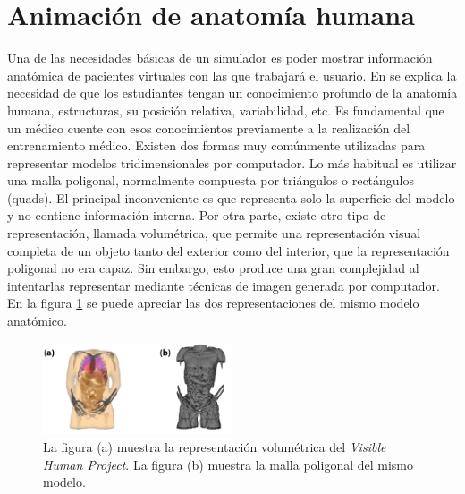 \section{Animación de anatomía humana} 
\label{anatomy}



Una de las necesidades básicas de un simulador es poder mostrar información anatómica de pacientes virtuales con las que trabajará el usuario. En  \cite{preim2018survey} se explica la necesidad de que los estudiantes tengan un conocimiento profundo de la anatomía humana, estructuras, su posición relativa, variabilidad, etc. Es fundamental que un médico cuente con esos conocimientos previamente a la realización del entrenamiento médico.
Existen dos formas muy comúnmente utilizadas para representar modelos tridimensionales por computador. Lo más habitual es utilizar una malla poligonal, normalmente compuesta por triángulos o rectángulos (quads). El principal inconveniente es que representa solo la superficie del modelo y no contiene información interna.  %
Por otra parte, existe otro tipo de representación, llamada volumétrica, que permite una representación visual completa de un objeto tanto del exterior como del interior, que la representación poligonal no era capaz. Sin embargo, esto produce una gran complejidad al intentarlas representar mediante técnicas de imagen generada por computador.
En la figura \ref{fig:HVP} se puede apreciar las dos representaciones del mismo modelo anatómico.

\begin{figure}[h]
   \centering
    \includegraphics[width=0.5\textwidth]{IMG/volvsb-rep.png}
    \caption{La figura (a) muestra la representación volumétrica del \emph{Visible Human Project}\cite{ackerman1998visible}. La figura (b) muestra la malla poligonal del mismo modelo. }
   \label{fig:HVP}
\end{figure}



